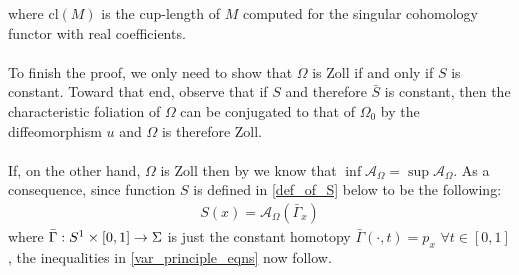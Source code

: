 \documentclass[11pt]{amsart}
\theoremstyle{plain}
\theoremstyle{definition}
\theoremstyle{remark}
\begin{document}
where $\text{cl}(M)$ is the cup-length of $M$ computed for the singular cohomology functor with real coefficients.\\
\\
To finish the proof, we only need to show that $\Omega$ is Zoll if and only if $S$ is constant. Toward that end, observe that if $S$ and therefore $\bar{S}$ is constant, then the characteristic foliation of $\Omega$ can be conjugated to that of $\Omega_0$ by the diffeomorphism $u$ and $\Omega$ is therefore Zoll.\\
\\
If, on the other hand, $\Omega$ is Zoll then by \cite[Proposition 7.4 (iii)]{B-K-Odd_Symp} we know that $\inf\mathcal{A}_{\Omega} = \sup\mathcal{A}_{\Omega}$. As a consequence, since function $S$ is defined in \eqref{def_of_S} below to be the following:
\begin{align*}
    S(x) = \mathcal{A}_{\Omega}(\bar{\Gamma}_x) 
\end{align*}
where $\Bar{\Gamma}: S^1 \times
 [0,1] \rightarrow \Sigma$ is just the constant homotopy $\bar{\Gamma}(\cdot, t) = p_x$ $\forall t \in [0,1]$, the inequalities in \eqref{var_principle_eqns} now follow.
\end{document}
